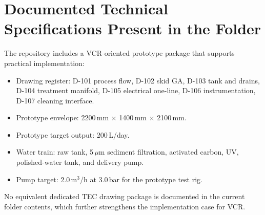 \documentclass[11pt,a4paper]{article}
\begin{document}
\section{Documented Technical Specifications Present in the Folder}
The repository includes a VCR-oriented prototype package that supports practical implementation:
\begin{itemize}[leftmargin=*]
  \item Drawing register: D-101 process flow, D-102 skid GA, D-103 tank and drains, D-104 treatment manifold, D-105 electrical one-line, D-106 instrumentation, D-107 cleaning interface.
  \item Prototype envelope: 2200\,mm $\times$ 1400\,mm $\times$ 2100\,mm.
  \item Prototype target output: 200\,L/day.
  \item Water train: raw tank, 5\,$\mu$m sediment filtration, activated carbon, UV, polished-water tank, and delivery pump.
  \item Pump target: 2.0\,m$^3$/h at 3.0\,bar for the prototype test rig.
\end{itemize}

\noindent
No equivalent dedicated TEC drawing package is documented in the current folder contents, which further strengthens the implementation case for VCR.
\end{document}
